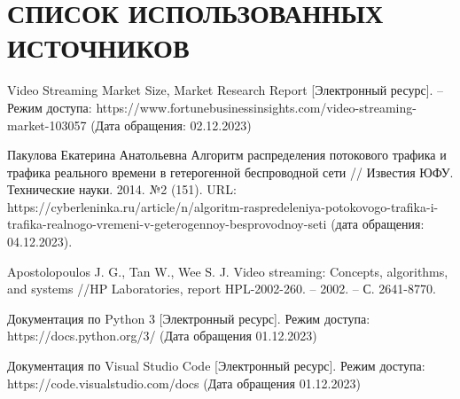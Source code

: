 \section*{СПИСОК ИСПОЛЬЗОВАННЫХ ИСТОЧНИКОВ}

\begingroup
\renewcommand{\section}[2]{}
\begin{thebibliography}{}
	 Video Streaming Market Size, Market Research Report [Электронный ресурс]. -- Режим доступа: https://www.fortunebusinessinsights.com/video-streaming-market-103057 (Дата обращения: 02.12.2023)
	
	 Пакулова Екатерина Анатольевна Алгоритм распределения потокового трафика и трафика реального времени в гетерогенной беспроводной сети // Известия ЮФУ. Технические науки. 2014. №2 (151). URL: https://cyberleninka.ru/article/n/algoritm-raspredeleniya-potokovogo-trafika-i-trafika-realnogo-vremeni-v-geterogennoy-besprovodnoy-seti (дата обращения: 04.12.2023).
	
	 Apostolopoulos J. G., Tan W., Wee S. J. Video streaming: Concepts, algorithms, and systems //HP Laboratories, report HPL-2002-260. – 2002. – С. 2641-8770.
	
	 Документация по Python 3 [Электронный ресурс]. Режим доступа: https://docs.python.org/3/ (Дата обращения 01.12.2023)
	
	 Документация по Visual Studio Code [Электронный ресурс]. Режим доступа: https://code.visualstudio.com/docs (Дата обращения 01.12.2023)
	
\end{thebibliography}
\endgroup

\pagebreak